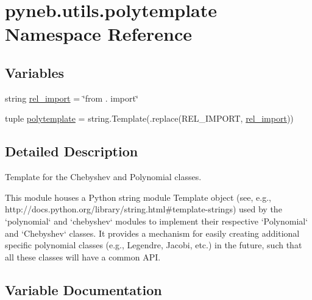 \hypertarget{namespacepyneb_1_1utils_1_1polytemplate}{}\section{pyneb.\+utils.\+polytemplate Namespace Reference}
\label{namespacepyneb_1_1utils_1_1polytemplate}
\subsection*{Variables}
\begin{DoxyCompactItemize}
\item 
string \hyperlink{namespacepyneb_1_1utils_1_1polytemplate_af687173fec33101d65eb86ef900d1ae8}{rel\+\_\+import} = \char`\"{}from . import\char`\"{}
\item 
tuple \hyperlink{namespacepyneb_1_1utils_1_1polytemplate_ad80e38c107bba3d56d77ce573d1e6d31}{polytemplate} = string.\+Template(.replace(\textquotesingle{}R\+E\+L\+\_\+\+I\+M\+P\+O\+R\+T\textquotesingle{}, \hyperlink{namespacepyneb_1_1utils_1_1polytemplate_af687173fec33101d65eb86ef900d1ae8}{rel\+\_\+import}))
\end{DoxyCompactItemize}


\subsection{Detailed Description}
\begin{DoxyVerb}Template for the Chebyshev and Polynomial classes.

This module houses a Python string module Template object (see, e.g.,
http://docs.python.org/library/string.html#template-strings) used by
the `polynomial` and `chebyshev` modules to implement their respective
`Polynomial` and `Chebyshev` classes.  It provides a mechanism for easily
creating additional specific polynomial classes (e.g., Legendre, Jacobi,
etc.) in the future, such that all these classes will have a common API.\end{DoxyVerb}
 

\subsection{Variable Documentation}
\hypertarget{namespacepyneb_1_1utils_1_1polytemplate_ad80e38c107bba3d56d77ce573d1e6d31}{}
